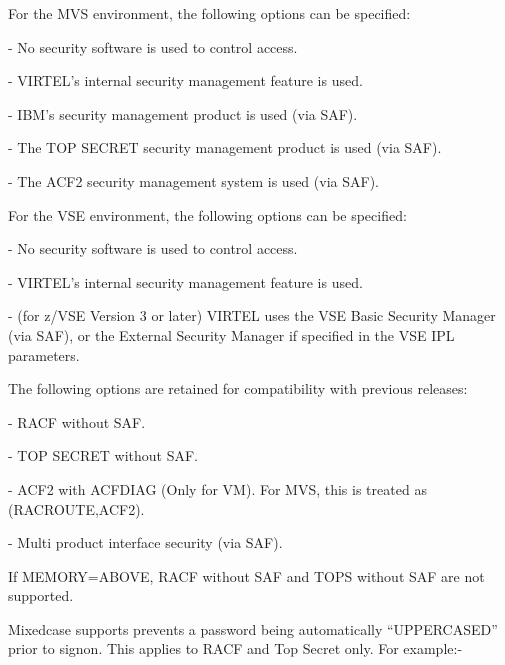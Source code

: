 \documentclass[letterpaper,10pt,english]{sphinxmanual}
\begin{document}
For the MVS environment, the following options can be specified:

 - No security software is used to control access.

 - VIRTEL’s internal security management feature is used.

 - IBM’s security management product is used (via SAF).

 - The TOP SECRET security management product is used (via SAF).

 - The ACF2 security management system is used (via SAF).

For the VSE environment, the following options can be specified:

 - No security software is used to control access.

 - VIRTEL’s internal security management feature is used.

 - (for z/VSE Version 3 or later) VIRTEL uses the VSE Basic Security Manager (via SAF), or the External Security Manager if specified in the VSE IPL parameters.

The following options are retained for compatibility with previous releases:

 - RACF without SAF.

 - TOP SECRET without SAF.

 - ACF2 with ACFDIAG (Only for VM). For MVS, this is treated as (RACROUTE,ACF2).

 - Multi product interface security (via SAF).

If MEMORY=ABOVE, RACF without SAF and TOPS without SAF are not supported.

Mixedcase supports prevents a password being automatically “UPPERCASED” prior to signon. This applies to RACF and Top Secret only. For example:-

\begin{sphinxVerbatim}[commandchars=\\\{\}]
\end{sphinxVerbatim}
\end{document}

